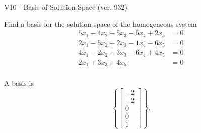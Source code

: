\begin{exercise}
  \begin{exerciseTitle}V10 - Basis of Solution Space (ver. 932)\end{exerciseTitle}
  \begin{exerciseStatement}
    Find a basis for the solution space of the homogeneous system 
\begin{align*}
 5 x_ 1 -4 x_ 2 + 5 x_ 3 -5 x_ 4 + 2 x_ 5 &= 0  \\ 
  2 x_ 1 -5 x_ 2 + 2 x_ 3 -1 x_ 4 -6 x_ 5 &= 0  \\ 
  4 x_ 1 -2 x_ 2 + 3 x_ 3 -6 x_ 4 + 4 x_ 5 &= 0  \\ 
  2 x_ 1 + 3 x_ 3 + 4 x_ 5 &= 0  \\ 
 \end{align*}


 
  \end{exerciseStatement}

  \begin{exerciseAnswer}
   A basis is   
\[\left\{\left[\begin{array}{c}
-2 \\
-2 \\
0 \\
0 \\
1
\end{array}\right]\right\}.\]

  


  \end{exerciseAnswer}
\end{exercise}